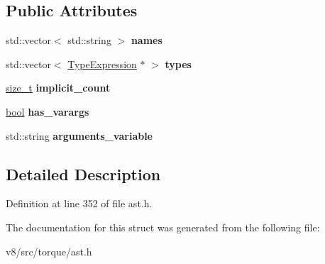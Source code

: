 \subsection*{Public Attributes}
\begin{DoxyCompactItemize}
\item 
\mbox{\label{structv8_1_1internal_1_1torque_1_1ParameterList_a8282ca8f612fb7a493838fe9c5e58fab}} 
std\+::vector$<$ std\+::string $>$ {\bfseries names}
\item 
\mbox{\label{structv8_1_1internal_1_1torque_1_1ParameterList_a2cdddbdc1b44276a3c4e0c0efb61d45f}} 
std\+::vector$<$ \mbox{\hyperlink{structv8_1_1internal_1_1torque_1_1TypeExpression}{Type\+Expression}} $\ast$ $>$ {\bfseries types}
\item 
\mbox{\label{structv8_1_1internal_1_1torque_1_1ParameterList_aa5eb271fcfd8ee37e65426d1cc3a2620}} 
\mbox{\hyperlink{classsize__t}{size\+\_\+t}} {\bfseries implicit\+\_\+count}
\item 
\mbox{\label{structv8_1_1internal_1_1torque_1_1ParameterList_a0f34fd45808f0939f74b68e25092fa6c}} 
\mbox{\hyperlink{classbool}{bool}} {\bfseries has\+\_\+varargs}
\item 
\mbox{\label{structv8_1_1internal_1_1torque_1_1ParameterList_a5a06bf08d8458d6219bc0c338c0d012b}} 
std\+::string {\bfseries arguments\+\_\+variable}
\end{DoxyCompactItemize}


\subsection{Detailed Description}


Definition at line 352 of file ast.\+h.



The documentation for this struct was generated from the following file\+:\begin{DoxyCompactItemize}
\item 
v8/src/torque/ast.\+h\end{DoxyCompactItemize}
